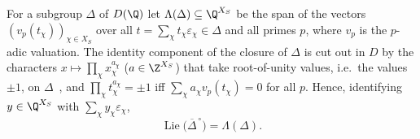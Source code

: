 For a subgroup $\Delta$ of $D(\Q)$ let $\Lambda(\Delta)\subseteq\Q^{X_S}$ be the span of the vectors
$(v_p(t_\chi))_{\chi\in X_S}$ over all $t=\sum_\chi t_\chi\varepsilon_\chi\in\Delta$ and all primes $p$,
where $v_p$ is the $p$-adic valuation. The identity component of the closure of $\Delta$ is cut out in
$D$ by the characters $x\mapsto\prod_\chi x_\chi^{a_\chi}$ ($a\in\Z^{X_S}$) that take root-of-unity
values, i.e.\ the values $\pm1$, on $\Delta$~\cite[8.2, 8.12]{Bor91}, and $\prod_\chi t_\chi^{a_\chi}=\pm1$
iff $\sum_\chi a_\chi v_p(t_\chi)=0$ for all $p$. Hence, identifying $y\in\Q^{X_S}$ with
$\sum_\chi y_\chi\varepsilon_\chi$,
\begin{equation}\label{eq:lietorus}
\operatorname{Lie}\bigl(\overline\Delta^{\,\circ}\bigr)=\Lambda(\Delta).
\end{equation}

